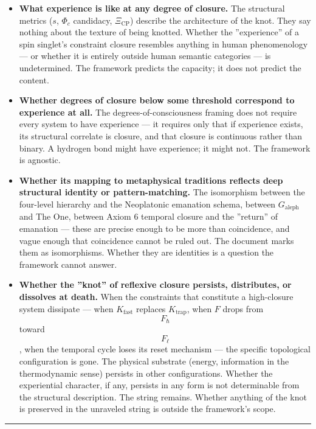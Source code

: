 \documentclass[12pt,a4paper]{article}
\begin{document}
\begin{itemize}
    \item \textbf{What experience is like at any degree of closure.} The structural metrics ($s$, $\Phi_c$ candidacy, $\Xi_\text{CP}$) describe the architecture of the knot. They say nothing about the texture of being knotted. Whether the ''experience'' of a spin singlet's constraint closure resembles anything in human phenomenology --- or whether it is entirely outside human semantic categories --- is undetermined. The framework predicts the capacity; it does not predict the content.
    \item \textbf{Whether degrees of closure below some threshold correspond to experience at all.} The degrees-of-consciousness framing does not require every system to have experience --- it requires only that if experience exists, its structural correlate is closure, and that closure is continuous rather than binary. A hydrogen bond might have experience; it might not. The framework is agnostic.
    \item \textbf{Whether its mapping to metaphysical traditions reflects deep structural identity or pattern-matching.} The isomorphism between the four-level hierarchy and the Neoplatonic emanation schema, between $G_\text{aleph}$ and The One, between Axiom 6 temporal closure and the ''return'' of emanation --- these are precise enough to be more than coincidence, and vague enough that coincidence cannot be ruled out. The document marks them as isomorphisms. Whether they are identities is a question the framework cannot answer.
    \item \textbf{Whether the ''knot'' of reflexive closure persists, distributes, or dissolves at death.} When the constraints that constitute a high-closure system dissipate --- when $K_\text{fast}$ replaces $K_\text{trap}$, when $F$ drops from $$F_{\hbar}$$ toward $$F_{\ell}$$, when the temporal cycle loses its reset mechanism --- the specific topological configuration is gone. The physical substrate (energy, information in the thermodynamic sense) persists in other configurations. Whether the experiential character, if any, persists in any form is not determinable from the structural description. The string remains. Whether anything of the knot is preserved in the unraveled string is outside the framework's scope.
\end{itemize}

\begin{center}
\rule{0.5\textwidth}{0.4pt}
\end{center}
\end{document}
